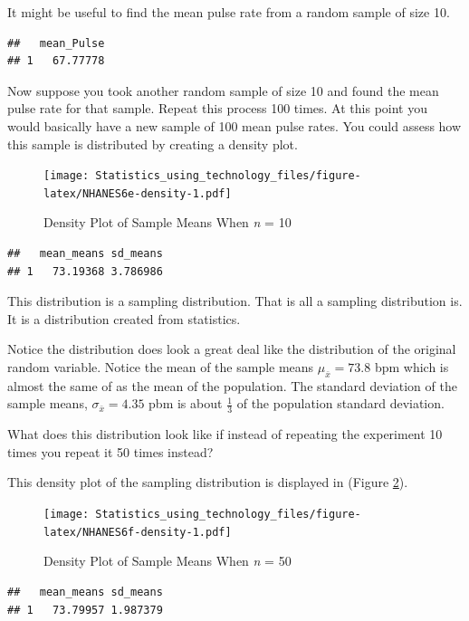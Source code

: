 \documentclass[
]{book}
\begin{document}
It might be useful to find the mean pulse rate from a random sample of size 10.

\begin{verbatim}
##   mean_Pulse
## 1   67.77778
\end{verbatim}

Now suppose you took another random sample of size 10 and found the mean pulse rate for that sample. Repeat this process 100 times. At this point you would basically have a new sample of 100 mean pulse rates. You could assess how this sample is distributed by creating a density plot.



\begin{figure}
\centering
\texttt{[image: Statistics\_using\_technology\_files/figure-latex/NHANES6e-density-1.pdf]}
\caption{\label{fig:NHANES6e-density}Density Plot of Sample Means When \emph{n} = 10}
\end{figure}

\begin{verbatim}
##   mean_means sd_means
## 1   73.19368 3.786986
\end{verbatim}

This distribution is a sampling distribution. That is all a sampling distribution is. It is a distribution created from statistics.

Notice the distribution does look a great deal like the distribution of the original random variable. Notice the mean of the sample means \(\mu_{\bar{x}} = 73.8\) bpm which is almost the same of as the mean of the population. The standard deviation of the sample means, \(\sigma_{\bar{x}}=4.35\) pbm is about \(\frac{1}{3}\) of the population standard deviation.

What does this distribution look like if instead of repeating the experiment 10 times you repeat it 50 times instead?

This density plot of the sampling distribution is displayed in (Figure \ref{fig:NHANES6f-density}).



\begin{figure}
\centering
\texttt{[image: Statistics\_using\_technology\_files/figure-latex/NHANES6f-density-1.pdf]}
\caption{\label{fig:NHANES6f-density}Density Plot of Sample Means When \emph{n} = 50}
\end{figure}

\begin{verbatim}
##   mean_means sd_means
## 1   73.79957 1.987379
\end{verbatim}
\end{document}
